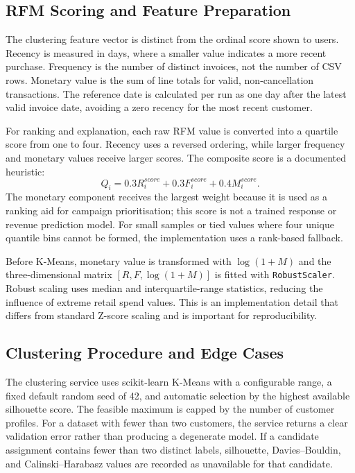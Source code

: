 \documentclass[conference]{IEEEtran}
\begin{document}
\subsection{RFM Scoring and Feature Preparation}
The clustering feature vector is distinct from the ordinal score shown to users. Recency is measured in days, where a smaller value indicates a more recent purchase. Frequency is the number of distinct invoices, not the number of CSV rows. Monetary value is the sum of line totals for valid, non-cancellation transactions. The reference date is calculated per run as one day after the latest valid invoice date, avoiding a zero recency for the most recent customer.

For ranking and explanation, each raw RFM value is converted into a quartile score from one to four. Recency uses a reversed ordering, while larger frequency and monetary values receive larger scores. The composite score is a documented heuristic:
\begin{equation}
Q_i = 0.3R_i^{score}+0.3F_i^{score}+0.4M_i^{score}.
\end{equation}
The monetary component receives the largest weight because it is used as a ranking aid for campaign prioritisation; this score is not a trained response or revenue prediction model. For small samples or tied values where four unique quantile bins cannot be formed, the implementation uses a rank-based fallback.

Before K-Means, monetary value is transformed with $\log(1+M)$ and the three-dimensional matrix $[R,F,\log(1+M)]$ is fitted with \texttt{RobustScaler}. Robust scaling uses median and interquartile-range statistics, reducing the influence of extreme retail spend values. This is an implementation detail that differs from standard Z-score scaling and is important for reproducibility.

\subsection{Clustering Procedure and Edge Cases}
The clustering service uses scikit-learn K-Means with a configurable range, a fixed default random seed of 42, and automatic selection by the highest available silhouette score. The feasible maximum is capped by the number of customer profiles. For a dataset with fewer than two customers, the service returns a clear validation error rather than producing a degenerate model. If a candidate assignment contains fewer than two distinct labels, silhouette, Davies--Bouldin, and Calinski--Harabasz values are recorded as unavailable for that candidate.
\end{document}
